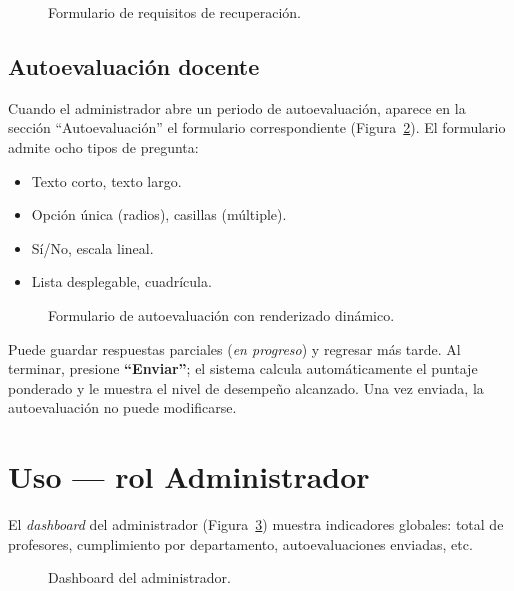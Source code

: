 \documentclass{computacion}
\begin{document}
\begin{figure}[!ht]
    \centering
    \caption{Formulario de requisitos de recuperación.}
    \label{fig:m-req-form}
\end{figure}

\subsection{Autoevaluación docente}

Cuando el administrador abre un periodo de autoevaluación, aparece en la sección ``Autoevaluación'' el formulario correspondiente (Figura~\ref{fig:m-autoeval}). El formulario admite ocho tipos de pregunta:

\begin{itemize}
    \item Texto corto, texto largo.
    \item Opción única (radios), casillas (múltiple).
    \item Sí/No, escala lineal.
    \item Lista desplegable, cuadrícula.
\end{itemize}

\begin{figure}[!ht]
    \centering
    \caption{Formulario de autoevaluación con renderizado dinámico.}
    \label{fig:m-autoeval}
\end{figure}

Puede guardar respuestas parciales (\emph{en progreso}) y regresar más tarde. Al terminar, presione \textbf{``Enviar''}; el sistema calcula automáticamente el puntaje ponderado y le muestra el nivel de desempeño alcanzado. Una vez enviada, la autoevaluación no puede modificarse.

\section{Uso — rol Administrador}

El \emph{dashboard} del administrador (Figura~\ref{fig:m-admin-dash}) muestra indicadores globales: total de profesores, cumplimiento por departamento, autoevaluaciones enviadas, etc.

\begin{figure}[!ht]
    \centering
    \caption{Dashboard del administrador.}
    \label{fig:m-admin-dash}
\end{figure}
\end{document}
